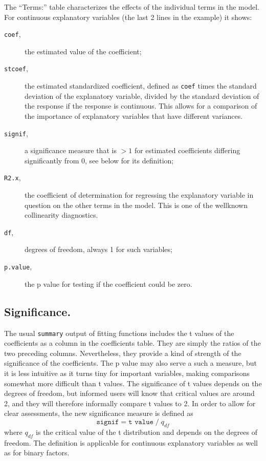 \documentclass{article}
\providecommand{\T}{\texttt}
\begin{document}
The ``Terms:'' table characterizes the effects of the individual terms in the
model. For continuous explanatory variables (the last 2 lines in the
example) it shows:
\begin{description}
\item[\T{coef},] the estimated value of the coefficient;
\item[\T{stcoef},] the estimated standardized coefficient,
  defined as \T{coef} times the standard deviation of the explanatory
  variable, divided by the standard deviation of the response if
  the response is continuous. This allows for a comparison of the 
  importance of explanatory variables that have different variances.
\item[\T{signif},] a significance measure that is $>1$ for estimated
  coefficients differing significantly from 0, see below for its
  definition;
\item[\T{R2.x},] the coefficient of determination for regressing 
  the explanatory variable in question on the other terms in the model.
  This is one of the wellknown collinearity diagnostics.
\item[\T{df},] degrees of freedom, always 1 for such variables;
\item[\T{p.value},] the p value for testing if the coefficient could be
  zero. 
\end{description}

\subsection{Significance.}
The usual \T{summary} output of fitting functions includes the 
t values of the coefficients as a column in the coefficients table. 
They are simply the ratios of the two preceding columns. 
Nevertheless, they provide a kind of strength of the significance of the
coefficients. The p value may also serve a such a measure, but it is less 
intuitive as it turns tiny for important variables, making comparisons
somewhat more difficult than t values. 
The significance of t values depends on the degrees of freedom, but
informed users will know that critical values are around 2, and they will
therefore informally compare t values to 2. In order to allow for 
clear assessments, the new significance measure is defined as
\[
  \T{signif} = \T{t value}\;/\;q_{df}
\]
where $q_{df}$ is the critical value of the t distribution and depends on the
degrees of freedom. The definition is applicable for continuous explanatory
variables as well as for binary factors.
\end{document}
